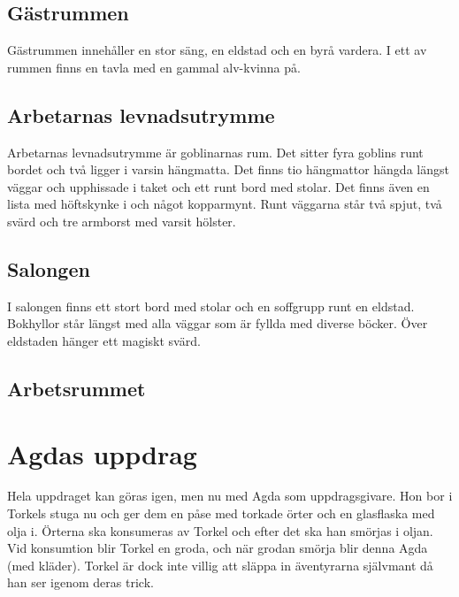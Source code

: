 \subsection*{Gästrummen}
Gästrummen innehåller en stor säng, en eldstad och en byrå vardera. I ett av rummen finns en tavla med en gammal alv-kvinna på. 

\subsection*{Arbetarnas levnadsutrymme}
Arbetarnas levnadsutrymme är goblinarnas rum. Det sitter fyra goblins runt bordet och två ligger i varsin hängmatta. Det finns tio hängmattor hängda längst väggar och upphissade i taket och ett runt bord med stolar. Det finns även en lista med höftskynke i och något kopparmynt. Runt väggarna står två spjut, två svärd och tre armborst med varsit hölster.

\subsection*{Salongen}
I salongen finns ett stort bord med stolar och en soffgrupp runt en eldstad. Bokhyllor står längst med alla väggar som är fyllda med diverse böcker. Över eldstaden hänger ett magiskt svärd. 

\subsection*{Arbetsrummet}
%
\section*{Agdas uppdrag}
Hela uppdraget kan göras igen, men nu med Agda som uppdragsgivare. Hon bor i Torkels stuga nu och ger dem en påse med torkade örter och en glasflaska med olja i. Örterna ska konsumeras av Torkel och efter det ska han smörjas i oljan. Vid konsumtion blir Torkel en groda, och när grodan smörja blir denna Agda (med kläder). Torkel är dock inte villig att släppa in äventyrarna självmant då han ser igenom deras trick.

